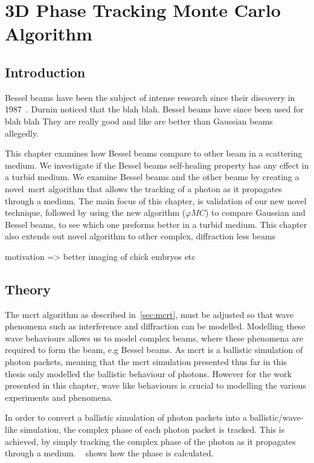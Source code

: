 \chapter{3D Phase Tracking Monte Carlo Algorithm}\label{sec:phase}

\section{Introduction}\label{sec:besintro}

Bessel beams have been the subject of intense research since their discovery in 1987~\cite{durnin1987diffraction,durnin1987exact}. Durnin noticed that the blah blah.
Bessel beams have since been used for blah blah
They are really good and like are better than Gaussian beams allegedly.

This chapter examines how Bessel beams compare to other beam in a scattering medium. 
We investigate if the Bessel beams self-healing property has any effect in a turbid medium.
We examine Bessel beams and the other beams by creating a novel~\gls{mcrt} algorithm that allows the tracking of a photon as it propagates through a medium. 
The main focus of this chapter, is validation of our new novel technique, followed by using the new algorithm ($\varphi MC$) to compare Gaussian and Bessel beams, to see which one preforms better in a turbid medium. 
This chapter also extends out novel algorithm to other complex, diffraction less beams


motivation => better imaging of chick embryos etc


\section{Theory}\label{sec:bestheory}

The \gls{mcrt} algorithm as described in~\cref{sec:mcrt}, must be adjusted so that wave phenomena such as interference and diffraction can be modelled. 
Modelling these wave behaviours allows us to model complex beams, where these phenomena are required to form the beam, e.g Bessel beams. 
As \gls{mcrt} is a ballistic simulation of photon packets, meaning that the \gls{mcrt} simulation presented thus far in this thesis only modelled the ballistic behaviour of photons. 
However for the work presented in this chapter, wave like behaviours is crucial to modelling the various experiments and phenomena.

In order to convert a ballistic simulation of photon packets into a ballistic/wave-like simulation, the complex phase of each photon packet is tracked.
This is achieved, by simply tracking the complex phase of the photon as it propagates through a medium.
~ shows how the phase is calculated.

